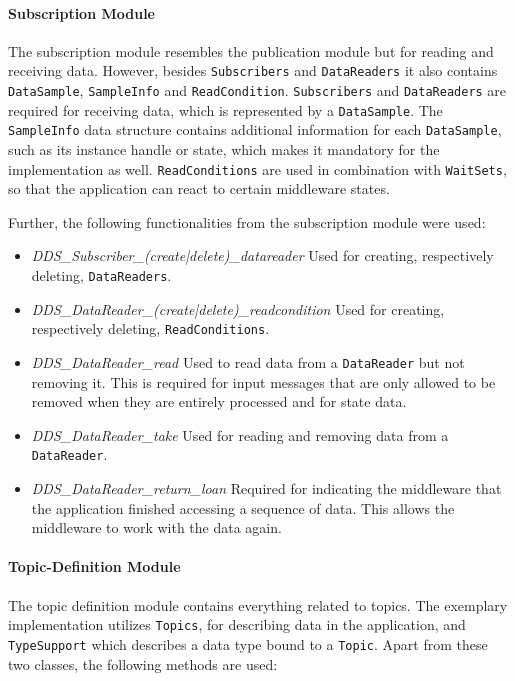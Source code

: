 \paragraph{Subscription Module}
The subscription module resembles the publication module but for reading and receiving data.
However, besides \texttt{Subscribers} and \texttt{DataReaders} it also contains \texttt{DataSample}, \texttt{SampleInfo} and \texttt{ReadCondition}.
\texttt{Subscribers} and \texttt{DataReaders} are required for receiving data, which is represented by a \texttt{DataSample}.
The \texttt{SampleInfo} data structure contains additional information for each \texttt{DataSample}, such as its instance handle or state, which makes it mandatory for the implementation as well.
\texttt{ReadConditions} are used in combination with \texttt{WaitSets}, so that the application can react to certain middleware states.

Further, the following functionalities from the subscription module were used:

\begin{itemize}
\item \textit{DDS\_Subscriber\_(create|delete)\_datareader} Used for creating, respectively deleting, \texttt{DataReaders}.
\item \textit{DDS\_DataReader\_(create|delete)\_readcondition} Used for creating, respectively deleting, \texttt{ReadConditions}.
\item \textit{DDS\_DataReader\_read} Used to read data from a \texttt{DataReader} but not removing it. This is required for input messages that are only allowed to be removed when they are entirely processed and for state data.
\item \textit{DDS\_DataReader\_take} Used for reading and removing data from a \texttt{DataReader}.
\item \textit{DDS\_DataReader\_return\_loan} Required for indicating the middleware that the application finished accessing a sequence of data. This allows the middleware to work with the data again.
\end{itemize}

\paragraph{Topic-Definition Module}
The topic definition module contains everything related to topics.
The exemplary implementation utilizes \texttt{Topics}, for describing data in the application, and \texttt{TypeSupport} which describes a data type bound to a \texttt{Topic}.
Apart from these two classes, the following methods are used:

